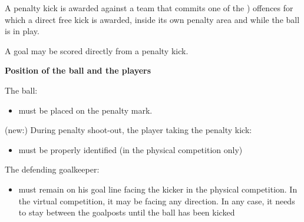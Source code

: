 \clearpage
\sffamily
{\bfseries \color[rgb]{0.4,0.4,0.4}{Law 14 -- The Penalty Kick}}
{}

\bigskip
A penalty kick is awarded against a team that commits one of the
) offences for which a direct free kick is awarded,
inside its own penalty area and while the ball is in play.

\bigskip

A goal may be scored directly from a penalty kick.

\bigskip


\bigskip

{\bfseries Position of the ball and the players }

\headlinebox

The ball:

\begin{itemize}
\item must be placed on the penalty mark.
\end{itemize}

(new:) During penalty shoot-out, the player taking the penalty kick:

\begin{itemize}
\item must be properly identified (in the physical competition only)
\end{itemize}


The defending goalkeeper:

\begin{itemize}
\item must remain on  his goal line facing the kicker in the physical competition. In the virtual competition, it may be facing any direction. In any case, it needs to stay between the goalposts until the ball has been kicked
\end{itemize}


